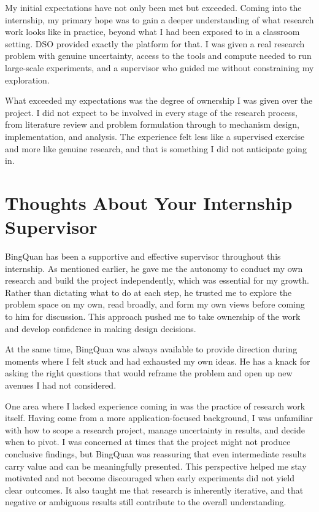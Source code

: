 \documentclass[12pt,a4paper]{article}
\begin{document}
My initial expectations have not only been met but exceeded. Coming into the internship, my primary hope was to gain a deeper understanding of what research work looks like in practice, beyond what I had been exposed to in a classroom setting. DSO provided exactly the platform for that. I was given a real research problem with genuine uncertainty, access to the tools and compute needed to run large-scale experiments, and a supervisor who guided me without constraining my exploration.

What exceeded my expectations was the degree of ownership I was given over the project. I did not expect to be involved in every stage of the research process, from literature review and problem formulation through to mechanism design, implementation, and analysis. The experience felt less like a supervised exercise and more like genuine research, and that is something I did not anticipate going in.



\section{Thoughts About Your Internship Supervisor}

BingQuan has been a supportive and effective supervisor throughout this internship. As mentioned earlier, he gave me the autonomy to conduct my own research and build the project independently, which was essential for my growth. Rather than dictating what to do at each step, he trusted me to explore the problem space on my own, read broadly, and form my own views before coming to him for discussion. This approach pushed me to take ownership of the work and develop confidence in making design decisions.

At the same time, BingQuan was always available to provide direction during moments where I felt stuck and had exhausted my own ideas. He has a knack for asking the right questions that would reframe the problem and open up new avenues I had not considered.

One area where I lacked experience coming in was the practice of research work itself. Having come from a more application-focused background, I was unfamiliar with how to scope a research project, manage uncertainty in results, and decide when to pivot. I was concerned at times that the project might not produce conclusive findings, but BingQuan was reassuring that even intermediate results carry value and can be meaningfully presented. This perspective helped me stay motivated and not become discouraged when early experiments did not yield clear outcomes. It also taught me that research is inherently iterative, and that negative or ambiguous results still contribute to the overall understanding.
\end{document}
